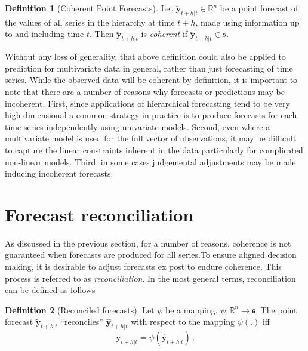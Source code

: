 \documentclass[12pt]{article}
\theoremstyle{definition}
\newtheorem{definition}{Definition}[section]
\begin{document}
	\begin{definition}[Coherent Point Forecasts]\label{def:cohpoint}
		Let $\breve{\bm{y}}_{t+h|t} \in \mathbb{R}^n$ be a point forecast of the values of all series in the hierarchy at time $t+h$, made using information up to and including time $t$. Then $\breve{\bm{y}}_{t+h|t}$ is \emph{coherent} if $\breve{\bm{y}}_{t+h|t} \in \mathfrak{s}$.
	\end{definition}

    Without any loss of generality, that above definition could also be applied to prediction for multivariate data in general, rather than just forecasting of time series.  While the observed data will be coherent by definition, it is important to note that there are a number of reasons why forecasts or predictions may be incoherent.  First, since applications of hierarchical forecasting tend to be very high dimensional a common strategy in practice is to produce forecasts for each time series independently using univariate models.  Second, even where a multivariate model is used for the full vector of observations, it may be difficult to capture the linear constraints inherent in the data particularly for complicated non-linear models.  Third, in some cases judgemental adjustments may be made inducing incoherent forecasts. 
	
	
	
\section{Forecast reconciliation}\label{sec:Reconciliation}
	
	As discussed in the previous section, for a number of reasons, coherence is not guaranteed when forecasts are produced for all series.To ensure aligned decision making, it is desirable to adjust forecasts ex post to endure coherence.  This process is referred to as {\em reconciliation}.  In the most general terms, reconciliation can be defined as follows
	
	\begin{definition}[Reconciled forecasts]\label{def:reconpoint}
		Let $\psi$ be a mapping, $\psi:\mathbb{R}^n\rightarrow\mathfrak{s}$.  The point forecast $\tilde{\bm{y}}_{t+h|t}$ ``reconciles'' $\hat{\bm{y}}_{t+h|t}$ with respect to the mapping $\psi(.)$ iff
		\begin{equation}
		\tilde{\bm{y}}_{t+h|t}=\psi\left(\hat{\bm{y}}_{t+h|t}\right)\,.
		\end{equation}
	\end{definition}
	
\end{document}
